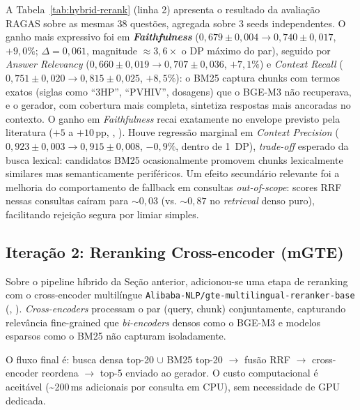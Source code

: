 \documentclass[
  12pt,
  oneside,
  a4paper,
  english,
  brazil
]{abntex2}
\begin{document}
A Tabela~\ref{tab:hybrid-rerank} (linha 2) apresenta o resultado da avaliação
RAGAS sobre as mesmas 38 questões, agregada sobre 3 seeds independentes. O
ganho mais expressivo foi em \textbf{\textit{Faithfulness}}
($0{,}679 \pm 0{,}004 \to 0{,}740 \pm 0{,}017$, $+9{,}0\%$; $\Delta = 0{,}061$,
magnitude $\approx 3{,}6\times$ o DP máximo do par), seguido por
\textit{Answer Relevancy}
($0{,}660 \pm 0{,}019 \to 0{,}707 \pm 0{,}036$, $+7{,}1\%$) e
\textit{Context Recall} ($0{,}751 \pm 0{,}020 \to 0{,}815 \pm 0{,}025$,
$+8{,}5\%$): o BM25 captura chunks com termos exatos (siglas como ``3HP'',
``PVHIV'', dosagens) que o BGE-M3 não recuperava, e o gerador, com cobertura
mais completa, sintetiza respostas mais ancoradas no contexto. O ganho em
\textit{Faithfulness} recai exatamente no envelope previsto pela literatura
($+5$ a $+10$\,pp, \citeauthor{wang2024bestpractices},
\citeyear{wang2024bestpractices}). Houve regressão marginal em
\textit{Context Precision} ($0{,}923 \pm 0{,}003 \to 0{,}915 \pm 0{,}008$,
$-0{,}9\%$, dentro de 1~DP), \textit{trade-off} esperado da busca lexical:
candidatos BM25 ocasionalmente promovem chunks lexicalmente similares mas
semanticamente periféricos. Um efeito secundário relevante foi a melhoria do
comportamento de fallback em consultas \textit{out-of-scope}: scores RRF
nessas consultas caíram para $\sim 0{,}03$ (vs. $\sim 0{,}87$ no
\textit{retrieval} denso puro), facilitando rejeição segura por limiar
simples.

\subsection{Iteração 2: Reranking Cross-encoder (mGTE)}
\label{sec:rerank}

Sobre o pipeline híbrido da Seção anterior, adicionou-se uma etapa
de reranking com o cross-encoder multilíngue
\texttt{Alibaba-NLP/gte-multilingual-reranker-base} (\citeauthor{zhang2024mgte},
\citeyear{zhang2024mgte}). \textit{Cross-encoders} processam o par
(query, chunk) conjuntamente, capturando relevância
fine-grained que \textit{bi-encoders} densos como o BGE-M3 e modelos esparsos
como o BM25 não capturam isoladamente.

O fluxo final é: busca densa top-20 $\cup$ BM25 top-20 $\to$ fusão RRF $\to$
cross-encoder reordena $\to$ top-5 enviado ao gerador. O custo
computacional é aceitável (\textasciitilde{}200\,ms adicionais por consulta
em CPU), sem necessidade de GPU dedicada.
\end{document}
